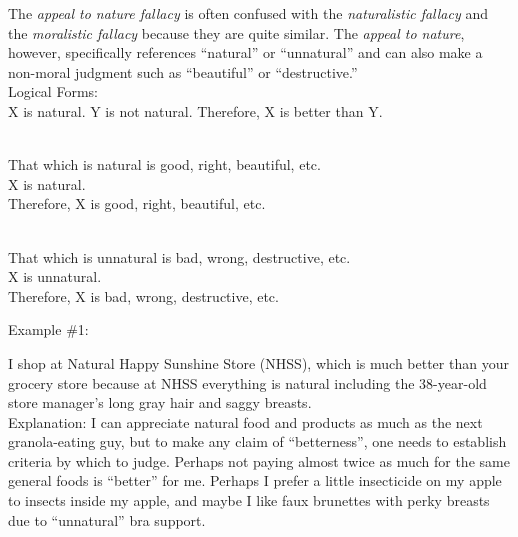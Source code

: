 \documentclass[a4paper,12pt,single,pdftex]{scrbook}
\begin{document}
    
      The {\it appeal to nature fallacy} is often confused with the {\it naturalistic fallacy} and the {\it moralistic fallacy} because they are quite similar. The {\it appeal to nature}, however, specifically references “natural” or “unnatural” and can also make a non-moral judgment such as “beautiful” or “destructive.”
    \\

    
      Logical Forms:
    \\

    
      X is natural. \newline
Y is not natural. \newline
Therefore, X is better than Y. \newline
 \newline

    \\

    
      That which is natural is good, right, beautiful, etc.
    \\

    
      X is natural.
    \\

    
      Therefore, X is good, right, beautiful, etc. \newline
 \newline

    \\

    
      That which is unnatural is bad, wrong, destructive, etc.
    \\

    
      X is unnatural.
    \\

    
      Therefore, X is bad, wrong, destructive, etc.
    \\

    
       \newline

      Example \#1: \newline
 \newline


      
        I shop at Natural Happy Sunshine Store (NHSS), which is much better than your grocery store because at NHSS everything is natural including the 38-year-old store manager’s long gray hair and saggy breasts.
      \\

      
        Explanation: I can appreciate natural food and products as much as the next granola-eating guy, but to make any claim of “betterness”, one needs to establish criteria by which to judge.  Perhaps not paying almost twice as much for the same general foods is “better” for me.  Perhaps I prefer a little insecticide on my apple to insects inside my apple, and maybe I like faux brunettes with perky breasts due to “unnatural” bra support.
      \\
\end{document}
